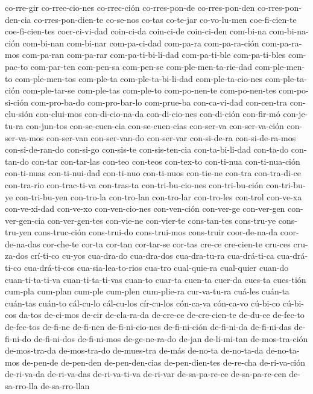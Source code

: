 {co-rre-gir co-rrec-cio-nes co-rrec-ción co-rres-pon-de co-rres-pon-den co-rres-pon-den-cia
co-rres-pon-dien-te co-se-nos co-tas co-te-jar co-vo-lu-men coe-fi-cien-te coe-fi-cien-tes coer-ci-vi-dad
coin-ci-da coin-ci-de coin-ci-den com-bi-na com-bi-na-ción com-bi-nan com-bi-nar com-pa-ci-dad com-pa-ra
com-pa-ra-ción com-pa-ra-mos com-pa-ran com-pa-rar com-pa-ti-bi-li-dad com-pa-ti-ble com-pa-ti-bles
com-pac-to com-par-ten com-pen-sa com-pen-se com-ple-men-ta-rie-dad com-ple-men-to com-ple-men-tos
com-ple-ta com-ple-ta-bi-li-dad com-ple-ta-cio-nes com-ple-ta-ción com-ple-tar-se com-ple-tas com-ple-to
com-po-nen-te com-po-nen-tes com-po-si-ción com-pro-ba-do com-pro-bar-lo com-prue-ba con-ca-vi-dad
con-cen-tra con-clu-sión con-clui-mos con-di-cio-na-da con-di-cio-nes con-di-ción con-fir-mó con-je-tu-ra
con-jun-tos con-se-cuen-cia con-se-cuen-cias con-ser-va con-ser-va-ción con-ser-va-mos con-ser-van
con-ser-van-do con-ser-var con-si-de-ra con-si-de-ra-mos con-si-de-ran-do con-si-go con-sis-te
con-sis-ten-cia con-ta-bi-li-dad con-ta-do con-tan-do con-tar con-tar-las con-teo con-teos con-tex-to
con-ti-nua con-ti-nua-ción con-ti-nuas con-ti-nui-dad con-ti-nuo con-ti-nuos con-tie-ne con-tra
con-tra-di-ce con-tra-rio con-trac-ti-va con-tras-ta con-tri-bu-cio-nes con-tri-bu-ción con-tri-bu-ye
con-tri-bu-yen con-tro-la con-tro-lan con-tro-lar con-tro-les con-trol con-ve-xa con-ve-xi-dad con-ve-xo
con-ven-cio-nes con-ven-ción con-ver-ge con-ver-gen con-ver-gen-cia con-ver-gen-tes con-vie-ne con-vier-te
cons-tan-tes cons-tru-ye cons-tru-yen cons-truc-ción cons-trui-do cons-trui-mos cons-truir coor-de-na-da
coor-de-na-das cor-che-te cor-ta cor-tan cor-tar-se cor-tas cre-ce cre-cien-te cru-ces cru-za-dos crí-ti-co
cu-yos cua-dra-do cua-dra-dos cua-dra-tu-ra cua-drá-ti-ca cua-drá-ti-co cua-drá-ti-cos cua-sia-lea-to-rios
cua-tro cual-quie-ra cual-quier cuan-do cuan-ti-ta-ti-va cuan-ti-ta-ti-vas cuan-to cuar-ta cuen-ta cuer-da
cues-ta cues-tión cum-pla cum-plan cum-ple cum-plen cum-plie-ra cur-va-tu-ra cuá-les cuán-ta cuán-tas
cuán-to cál-cu-lo cál-cu-los cír-cu-los cón-ca-va cón-ca-vo cú-bi-co cú-bi-cos da-tos de-ci-mos de-cir
de-cla-ra-da de-cre-ce de-cre-cien-te de-du-ce de-fec-to de-fec-tos de-fi-ne de-fi-nen de-fi-ni-cio-nes
de-fi-ni-ción de-fi-ni-da de-fi-ni-das de-fi-ni-do de-fi-ni-dos de-fi-ni-mos de-ge-ne-ra-do de-jan
de-li-mi-tan de-mos-tra-ción de-mos-tra-da de-mos-tra-do de-mues-tra de-más de-no-ta de-no-ta-da
de-no-ta-mos de-pen-de de-pen-den de-pen-den-cias de-pen-dien-tes de-re-cha de-ri-va-ción de-ri-va-da
de-ri-va-das de-ri-va-ti-va de-ri-var de-sa-pa-re-ce de-sa-pa-re-cen de-sa-rro-lla de-sa-rro-llan
}
